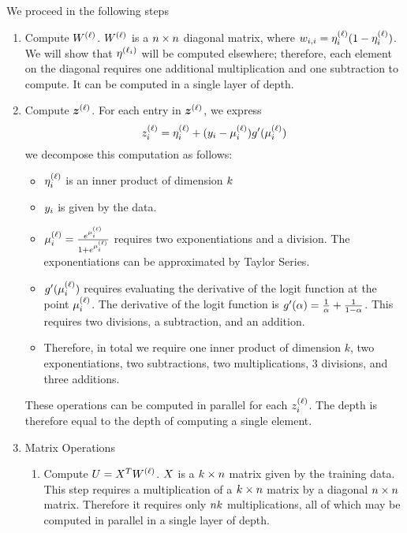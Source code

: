 We proceed in the following steps
\begin{enumerate}

	\item Compute $W^{(\ell)}$. 
	 $W^{(\ell)}$ is a $n \times n$ diagonal matrix, where
	  $w_{i,i} = \eta^{(\ell)}_{i}(1-\eta^{(\ell)}_{i}) $. 
	 We will show that $\eta^{(\ell_{i})}$ will be computed elsewhere; therefore, each element on the diagonal requires one additional multiplication and one subtraction to compute. It can be computed in a single layer of depth.
	
	\item Compute $\updatevector{\step}$.
	For each entry in $\updatevector{\step}$, we express
	\[
		z^{(\ell)}_{i} = \eta^{(\ell)}_{i} +
		 (y_{i} - \mu^{(\ell)}_{i})
		 g'(\mu^{(\ell)}_{i})
	\]
	we decompose this computation as follows:
	\begin{itemize}
		\item $\eta^{(\ell)}_{i}$ is an inner product of dimension $k$
		\item $y_{i}$ is given by the data. 
		\item $\mu^{(\ell)}_{i} = \frac{e^{\mu^{(\ell)}_{i}}}{1+e^{\mu^{(\ell)}_{i}}}$ requires two exponentiations and a division. The exponentiations can be approximated by Taylor Series. %
		\item $ g'(\mu^{(\ell)}_{i})$ requires evaluating the derivative of the logit function at the point $\mu^{(\ell)}_{i}$. The derivative of the logit function is $g'(\alpha) = \frac{1}{\alpha}+\frac{1}{1-\alpha}$. This requires two divisions, a subtraction, and an addition. 
		\item Therefore, in total we require one inner product of dimension $k$, two exponentiations, two subtractions, two multiplications, 3 divisions, and three additions.
	\end{itemize}
	
	These operations can be computed in parallel for each $z^{(\ell)}_{i}$. The depth is therefore equal to the depth of computing a single element.
	
	\item Matrix Operations
	\begin{enumerate}
		\item 
		Compute $U = X^{T} W^{(\ell)}$. $X$ is a $k \times n$ matrix  given by the training data. 
		This step requires a multiplication of a $k \times n$ matrix by a diagonal $n \times n$ matrix.
		Therefore it requires only $n k$ multiplications, all of which may be computed in parallel in a single layer of depth.
	

\end{enumerate}
\end{enumerate}
